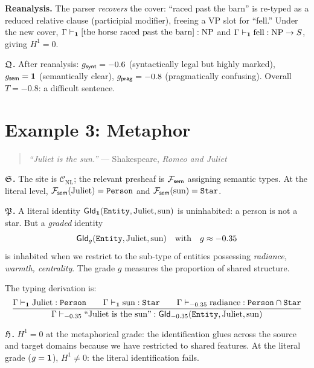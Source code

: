 \textbf{Reanalysis.}\quad
The parser \emph{recovers} the cover: ``raced past the barn'' is
re-typed as a reduced relative clause (participial modifier), freeing
a VP slot for ``fell.''
Under the new cover,
$\Gamma\vdash_{\mathbf{1}}[\text{the horse raced past the barn}]:
  \mathrm{NP}$
and
$\Gamma\vdash_{\mathbf{1}}\text{fell}:\mathrm{NP}\to S$,
giving $H^1=0$.

\textbf{$\mathfrak{Q}$.}\quad
After reanalysis:
$g_{\mathsf{synt}}=-0.6$ (syntactically legal but highly marked),
$g_{\mathsf{sem}}=\mathbf{1}$ (semantically clear),
$g_{\mathsf{prag}}=-0.8$ (pragmatically confusing).
Overall $T=-0.8$: a difficult sentence.

\medskip

\section{Example 3: Metaphor}
\label{sec:metaphor}

\begin{quote}
\emph{``Juliet is the sun.''}  --- Shakespeare, \emph{Romeo and Juliet}
\end{quote}

\textbf{$\mathfrak{S}$.}\quad
The site is $\mathcal{C}_{\mathrm{NL}}$; the relevant presheaf
is $\mathcal{F}_{\mathsf{sem}}$ assigning semantic types.  At the literal
level, $\mathcal{F}_{\mathsf{sem}}(\text{Juliet})=\texttt{Person}$ and
$\mathcal{F}_{\mathsf{sem}}(\text{sun})=\texttt{Star}$.

\textbf{$\mathfrak{P}$.}\quad
A literal identity $\mathsf{GId}_{\mathbf{1}}(\texttt{Entity},\text{Juliet},\text{sun})$
is uninhabited: a person is not a star.  But a \emph{graded} identity
\[
  \mathsf{GId}_g(\texttt{Entity},\text{Juliet},\text{sun})
  \quad\text{with}\quad g\approx -0.35
\]
is inhabited when we restrict to the sub-type of entities possessing
\emph{radiance, warmth, centrality}.  The grade $g$ measures the
proportion of shared structure.

The typing derivation is:
\[
  \dfrac{
    \Gamma\vdash_{\mathbf{1}}\text{Juliet}:\texttt{Person}
    \qquad
    \Gamma\vdash_{\mathbf{1}}\text{sun}:\texttt{Star}
    \qquad
    \Gamma\vdash_{-0.35}
      \mathrm{radiance}:\texttt{Person}\cap\texttt{Star}
  }{
    \Gamma\vdash_{-0.35}
      \text{``Juliet is the sun''}
      :\mathsf{GId}_{-0.35}(\texttt{Entity},\text{Juliet},\text{sun})
  }
\]

\textbf{$\mathfrak{H}$.}\quad
$H^1=0$ at the metaphorical grade: the identification glues
across the source and target domains because we have restricted
to shared features.  At the literal grade ($g=\mathbf{1}$), $H^1\neq 0$:
the literal identification fails.

